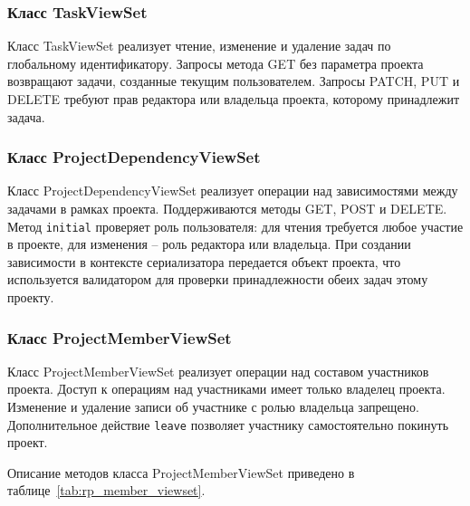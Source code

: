 \subsubsection{Класс TaskViewSet}

Класс TaskViewSet реализует чтение, изменение и удаление задач по глобальному идентификатору. Запросы метода GET без параметра проекта возвращают задачи, созданные текущим пользователем. Запросы PATCH, PUT и DELETE требуют прав редактора или владельца проекта, которому принадлежит задача.

\subsubsection{Класс ProjectDependencyViewSet}

Класс ProjectDependencyViewSet реализует операции над зависимостями между задачами в рамках проекта. Поддерживаются методы GET, POST и DELETE. Метод \texttt{initial} проверяет роль пользователя: для чтения требуется любое участие в проекте, для изменения -- роль редактора или владельца. При создании зависимости в контексте сериализатора передается объект проекта, что используется валидатором для проверки принадлежности обеих задач этому проекту.

\subsubsection{Класс ProjectMemberViewSet}

Класс ProjectMemberViewSet реализует операции над составом участников проекта. Доступ к операциям над участниками имеет только владелец проекта. Изменение и удаление записи об участнике с ролью владельца запрещено. Дополнительное действие \texttt{leave} позволяет участнику самостоятельно покинуть проект.

Описание методов класса ProjectMemberViewSet приведено в таблице~\ref{tab:rp_member_viewset}.

